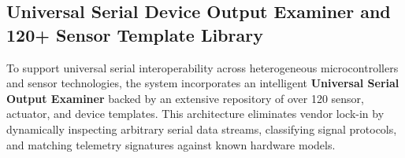 \documentclass[12pt,a4paper]{article}
\begin{document}
\begin{table}[H]
\centering
\caption{Comparative Matrix of Multi-Server Integration Options}
\label{tab:servers_comparison}
\end{table}

\subsection{Universal Serial Device Output Examiner and 120+ Sensor Template Library}
To support universal serial interoperability across heterogeneous microcontrollers and sensor technologies, the system incorporates an intelligent \textbf{Universal Serial Output Examiner} backed by an extensive repository of over 120 sensor, actuator, and device templates. This architecture eliminates vendor lock-in by dynamically inspecting arbitrary serial data streams, classifying signal protocols, and matching telemetry signatures against known hardware models.
\end{document}

